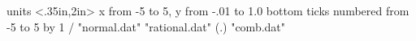 \beginpicture
  \setcoordinatesystem units <.35in,2in>
  \setplotarea x from -5 to 5, y from -.01 to 1.0
  \axis bottom  
    ticks numbered from -5 to 5 by 1 /
 \setquadratic
 \plot "normal.dat" 
 \plot "rational.dat" 
 \setplotsymbol({\rm .})
 \plot "comb.dat" 
\endpicture
